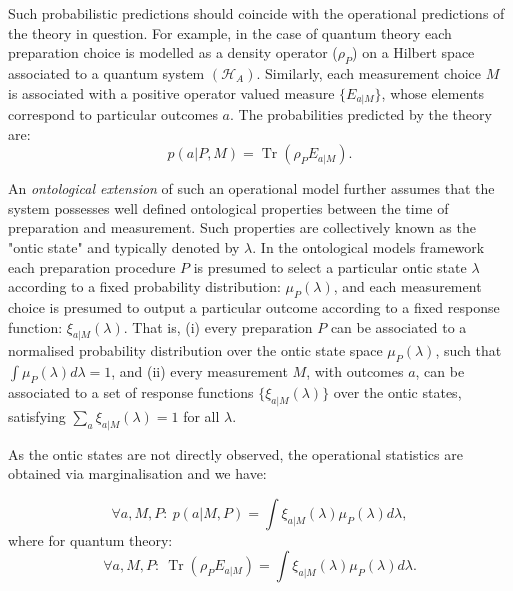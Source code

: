\documentclass[a4paper,onecolumn,11pt,accepted=2018-05-04]{quantumarticle}
\DeclareMathOperator{\tr}{Tr}
\begin{document}
Such probabilistic predictions should coincide with the operational predictions of the theory in question. For example, in the case of quantum theory each preparation choice is modelled as a density operator ($\rho_P$) on a Hilbert space associated to a quantum system $(\mathcal{H}_A)$. Similarly, each measurement choice $M$ is associated with a positive operator valued measure $ \{E_{a|M} \}$, whose elements correspond to particular outcomes $a$.
The probabilities predicted by the theory are:
\begin{equation}
p(a |P, M) = \tr( \rho_P E_{a|M}).
\end{equation}


An \emph{ontological extension} of such an operational model further assumes that the system possesses well defined ontological properties between the time of preparation and measurement. Such properties are collectively known as the "ontic state" and typically denoted by $\lambda$. In the ontological models framework each preparation procedure $P$ is presumed to select a particular ontic state $\lambda$ according to a fixed probability distribution: $\mu_P(\lambda)$, and each measurement choice is presumed to output a particular outcome according to a fixed response function: $ \xi_{a|M}(\lambda)$. That is, (i) every preparation $P$ can be associated to a normalised probability distribution over the ontic state space $\mu_P(\lambda)$, such that $\int\mu_P (\lambda)d\lambda = 1$, and (ii) every measurement $M$, with outcomes $a$, can be associated to a set of response functions $\{\xi_{a|M}(\lambda)\}$ over the ontic states, satisfying $\sum_a \xi_{a|M}(\lambda) = 1$ for all $\lambda$.

As the ontic states are not directly observed, the operational statistics are obtained via marginalisation and we have:

\begin{equation}\label{OntMod}
\forall a,M,P:~p(a|M,P) = \int \xi_{a|M}(\lambda) \mu_P(\lambda) d \lambda,
\end{equation}
where for quantum theory:
\begin{equation}
\forall a,M,P:~\tr( \rho_P E_{a|M}) = \int \xi_{a|M}(\lambda) \mu_P(\lambda) d \lambda.
\end{equation}
\end{document}
